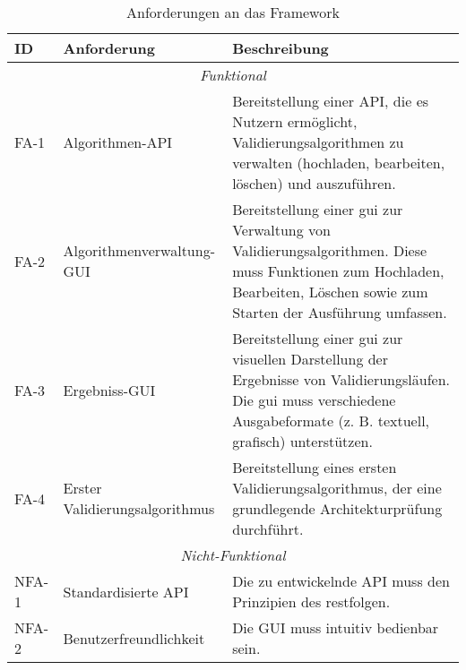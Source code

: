 \begin{table}[ht!]
  \centering
  \footnotesize
  \begin{tabularx}{\textwidth}{l l X}
    \toprule
    \textbf{ID} & \textbf{Anforderung}           & \textbf{Beschreibung}                                                                                                                                                                   \\
    \midrule
    \multicolumn{3}{c}{\textit{Funktional}}                                                                                                                                                                                                \\
    \midrule
    FA-1        & Algorithmen-API                & Bereitstellung einer API, die es Nutzern ermöglicht, Validierungsalgorithmen zu verwalten (hochladen, bearbeiten, löschen) und auszuführen.                                             \\
    \midrule
    FA-2        & Algorithmenverwaltung-GUI      & Bereitstellung einer \gls{gui} zur Verwaltung von Validierungsalgorithmen. Diese muss Funktionen zum Hochladen, Bearbeiten, Löschen sowie zum Starten der Ausführung umfassen.          \\
    \midrule
    FA-3        & Ergebniss-GUI                  & Bereitstellung einer \gls{gui} zur visuellen Darstellung der Ergebnisse von Validierungsläufen. Die \gls{gui} muss verschiedene Ausgabeformate (z. B. textuell, grafisch) unterstützen. \\
    \midrule
    FA-4        & Erster Validierungsalgorithmus & Bereitstellung eines ersten Validierungsalgorithmus, der eine grundlegende Architekturprüfung durchführt.                                                                               \\
    \bottomrule
    \multicolumn{3}{c}{\textit{Nicht-Funktional}}                                                                                                                                                                                          \\
    \midrule
    NFA-1       & Standardisierte API            & Die zu entwickelnde API muss den Prinzipien des \gls{rest}folgen.                                                                                                                       \\
    \midrule
    NFA-2       & Benutzerfreundlichkeit         & Die GUI muss intuitiv bedienbar sein.                                                                                                                                                   \\
    \bottomrule
  \end{tabularx}
  \caption{Anforderungen an das Framework}
  \label{tab:anforderungen}
\end{table}

